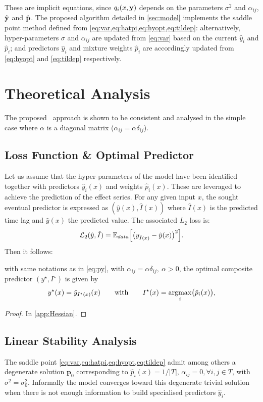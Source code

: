 These are implicit equations, since $q_i(x,{\bf y})$ depends on the parameters $\sigma^2$ and 
$\alpha_{ij}$, $\hat {\bf y}$ and $\hat{\bf p}$. The proposed algorithm detailed in \cref{sec:model} 
implements the saddle point method defined from \cref{eq:var,eq:hatpi,eq:hyopt,eq:tildep}: 
alternatively, hyper-parameters $\sigma$ and $\alpha_{ij}$ are updated from \cref{eq:var} based on 
the current $\hat y_i$ and $\hat p_i$; and predictors $\hat y_i$ and mixture weights $\hat p_i$ are 
accordingly updated from \cref{eq:hyopt} and \cref{eq:tildep} respectively. 

\section{Theoretical Analysis}\label{sec:dtlrtheory}
The proposed \XX\ approach is shown to be consistent and analysed in the simple case where $\alpha$ 
is a diagonal matrix ($\alpha_{ij} = \alpha\delta_{ij}$).

\subsection{Loss Function \& Optimal Predictor}\label{sec:prop}
Let us assume that the hyper-parameters of the model have been identified together with predictors 
$\hat y_i(x)$ and weights $\hat p_i(x)$. These are leveraged to achieve the prediction of the 
effect series. For any given input $x$, the sought eventual predictor is expressed as 
$(\hat y(x),\hat I(x))$ where $\hat I(x)$ is the predicted time lag and $\hat y(x)$ the predicted 
value. The associated $L_2$ loss is: 
%
\begin{equation}\label{eq:orloss}
  {\cal L}_2(\hat y,\hat I) = {\mathbb E}_{data}\Bigl[\bigl(y_{\hat I(x)}-\hat y(x)\bigr)^2\Bigr]. 
\end{equation}
%
Then it follows:
%
\begin{prop}\label{prop:opred}
with same notations as in \cref{eq:py}, with $\alpha_{ij} = \alpha\delta_{ij},\ \alpha>0$, 
the optimal composite predictor $(y^\star,I^\star)$ is given by
\[
  y^\star(x) = 
    \hat y_{I^\star(x)}(x)\qquad\text{with}\qquad I^\star(x) = \operatorname*{argmax}_{i} \bigl(\hat p_i(x)\bigr), 
\]
\end{prop}
%
\begin{proof}
In \cref{app:Hessian}.
\end{proof}

\subsection{Linear Stability Analysis}\label{sec:stability}
The saddle point \cref{eq:var,eq:hatpi,eq:hyopt,eq:tildep} admit among others a degenerate 
solution $\mathbf{p}_0$ corresponding to $\hat p_i(x) = 1/\vert T\vert$, 
$\alpha_{ij}=0, \forall i,j \in T$, with $\sigma^2 = \sigma_0^2$. Informally the model converges 
toward this degenerate trivial solution when there is not enough information to build specialised 
predictors $\hat y_i$. 


